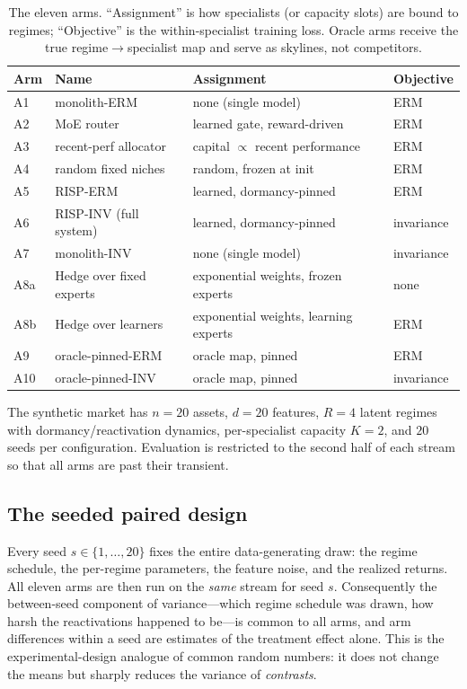\begin{table}[h]
\centering
\caption{The eleven arms. ``Assignment'' is how specialists (or capacity
slots) are bound to regimes; ``Objective'' is the within-specialist training
loss. Oracle arms receive the true regime$\to$specialist map and serve as
skylines, not competitors.}
\label{tab:dd5-arms}
\small
\begin{tabular}{llll}
\toprule
Arm & Name & Assignment & Objective \\
\midrule
A1 & monolith-ERM & none (single model) & ERM \\
A2 & MoE router & learned gate, reward-driven & ERM \\
A3 & recent-perf allocator & capital $\propto$ recent performance & ERM \\
A4 & random fixed niches & random, frozen at init & ERM \\
A5 & RISP-ERM & learned, dormancy-pinned & ERM \\
A6 & RISP-INV (full system) & learned, dormancy-pinned & invariance \\
A7 & monolith-INV & none (single model) & invariance \\
A8a & Hedge over fixed experts & exponential weights, frozen experts & none \\
A8b & Hedge over learners & exponential weights, learning experts & ERM \\
A9 & oracle-pinned-ERM & oracle map, pinned & ERM \\
A10 & oracle-pinned-INV & oracle map, pinned & invariance \\
\bottomrule
\end{tabular}
\end{table}

The synthetic market has $n=20$ assets, $d=20$ features, $R=4$ latent regimes
with dormancy/reactivation dynamics, per-specialist capacity $K=2$, and
$20$ seeds per configuration. Evaluation is restricted to the second half of
each stream so that all arms are past their transient.

\subsection{The seeded paired design}
\label{sec:dd5-paired}

Every seed $s \in \{1,\dots,20\}$ fixes the entire data-generating draw: the
regime schedule, the per-regime parameters, the feature noise, and the
realized returns. All eleven arms are then run on the \emph{same} stream for
seed $s$. Consequently the between-seed component of variance---which regime
schedule was drawn, how harsh the reactivations happened to be---is common to
all arms, and arm differences within a seed are estimates of the treatment
effect alone. This is the experimental-design analogue of common random
numbers: it does not change the means but sharply reduces the variance of
\emph{contrasts}.

